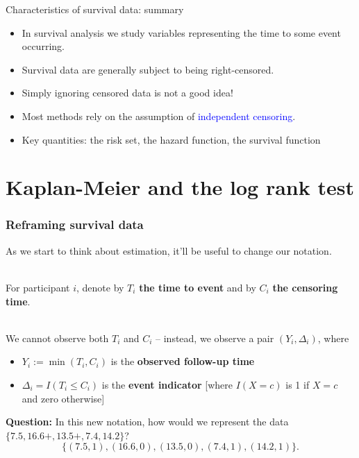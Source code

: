 \documentclass[10pt,t]{beamer}
\begin{document}
\begin{frame}{Characteristics of survival data: summary}
	\begin{itemize}
		\item In survival analysis we study variables representing the time to some event occurring.
		
		\medskip
		
		\item Survival data are generally subject to being right-censored.
		
		\medskip
		
		\item Simply ignoring censored data is not a good idea!
		
		\medskip
		
		\item Most methods rely on the assumption of \textcolor{blue}{independent censoring}.
		
		\medskip
		
		\item Key quantities: the risk set, the hazard function, the survival function
	\end{itemize}
\end{frame}


\section{Kaplan-Meier and the log rank test}

\begin{frame}
\frametitle{Reframing survival data}

As we start to think about estimation, it'll be useful to change our notation.
\\ ~\ 

For participant $i$, denote by $T_i$ \textbf{the time to event} and by $C_i$ \textbf{the censoring time}.   
\\ ~\ 

We cannot observe both $T_i$ and $C_i$ -- instead, we observe a pair $(Y_i, \Delta_i)$, where   
\begin{itemize}
\item $Y_i := \min(T_i, C_i)$ is the \textbf{observed follow-up time}  
\item $\Delta_i = I(T_i \leq C_i)$ is the \textbf{event indicator} [where $I(X = c)$ is 1 if $X = c$ and zero otherwise]  
\end{itemize}

\textbf{Question:} In this new notation, how would we represent the data $\{7.5, 16.6+, 13.5+, 7.4, 14.2\}$?  
\[\{(7.5, 1), (16.6, 0), (13.5, 0), (7.4, 1), (14.2, 1)\}.\]
\end{frame}
\end{document}
